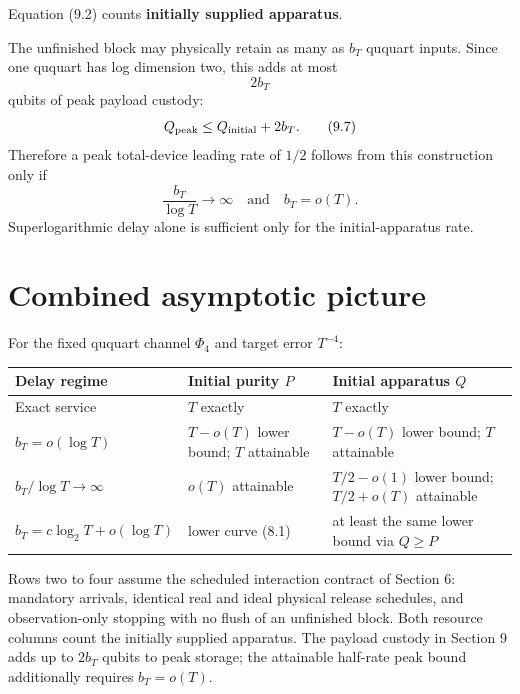 \documentclass[11pt,a4paper]{article}
\numberwithin{equation}{section}
\begin{document}
Equation (9.2) counts \textbf{initially supplied apparatus}.

The unfinished block may physically retain as many as \(b_T\) ququart
inputs. Since one ququart has log dimension two, this adds at most \[
2b_T
\] qubits of peak payload custody: \[
Q_{\rm peak}
\le
Q_{\rm initial}+2b_T.
\tag{9.7}
\] Therefore a peak total-device leading rate of \(1/2\) follows from
this construction only if \[
\frac{b_T}{\log T}\to\infty
\quad\text{and}\quad
b_T=o(T).
\tag{9.8}
\] Superlogarithmic delay alone is sufficient only for the
initial-apparatus rate.

\clearpage

\section{Combined asymptotic picture}\label{combined-asymptotic-picture}

For the fixed ququart channel \(\Phi_4\) and target error \(T^{-4}\):

\begin{longtable}[]{@{}
  >{\raggedright\arraybackslash}p{}
  >{\raggedleft\arraybackslash}p{}
  >{\raggedleft\arraybackslash}p{}@{}}
\toprule\noalign{}
\begin{minipage}[b]{\linewidth}\raggedright
Delay regime
\end{minipage} & \begin{minipage}[b]{\linewidth}\raggedleft
Initial purity \(P\)
\end{minipage} & \begin{minipage}[b]{\linewidth}\raggedleft
Initial apparatus \(Q\)
\end{minipage} \\
\midrule\noalign{}
\endhead
\bottomrule\noalign{}
\endlastfoot
Exact service & \(T\) exactly & \(T\) exactly \\
\(b_T=o(\log T)\) & \(T-o(T)\) lower bound; \(T\) attainable &
\(T-o(T)\) lower bound; \(T\) attainable \\
\(b_T/\log T\to\infty\) & \(o(T)\) attainable & \(T/2-o(1)\) lower
bound; \(T/2+o(T)\) attainable \\
\(b_T=c\log_2T+o(\log T)\) & lower curve (8.1) & at least the same lower
bound via \(Q\ge P\) \\
\end{longtable}

Rows two to four assume the scheduled interaction contract of Section 6:
mandatory arrivals, identical real and ideal physical release schedules,
and observation-only stopping with no flush of an unfinished block. Both
resource columns count the initially supplied apparatus. The payload
custody in Section 9 adds up to \(2b_T\) qubits to peak storage; the
attainable half-rate peak bound additionally requires \(b_T=o(T)\).
\end{document}

